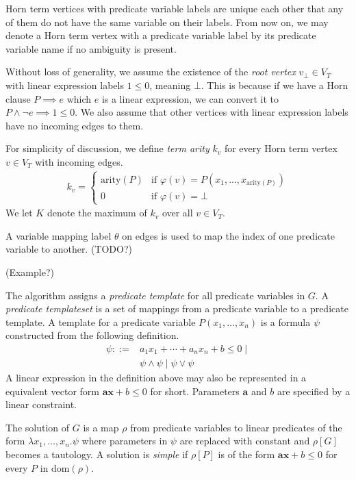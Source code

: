 \documentclass[a4paper,12pt]{article}
\begin{document}
Horn term vertices with predicate variable labels are unique each
other that any of them do not have the same variable on their labels.
From now on, we may denote a Horn term vertex with a predicate
variable label by its predicate variable name if no ambiguity is
present.

Without loss of generality, we assume the existence of the \emph{root
  vertex} $v_\bot \in V_T$ with linear expression labels $1 \leq 0$,
meaning $\bot$.  This is because if we have a Horn clause $P \implies
e$ which $e$ is a linear expression, we can convert it to $P \wedge
\neg e \implies 1 \leq 0$.  We also assume that other vertices with
linear expression labels have no incoming edges to them.

For simplicity of discussion, we define \emph{term arity} $k_v$ for
every Horn term vertex $v \in V_T$ with incoming edges.
\begin{align*}
k_v =
\begin{cases}
\mathrm{arity}(P) & \mbox{if } \varphi(v) = P(x_1,...,x_{\mathrm{arity}(P)}) \\
0 & \mbox{if } \varphi(v) = \bot
\end{cases}
\end{align*}
We let $K$ denote the maximum of $k_v$ over all $v \in V_T$.

A variable mapping label $\theta$ on edges is used to map the index of
one predicate variable to another. (TODO?)

(Example?)

The algorithm assigns a \emph{predicate template} for all predicate
variables in $G$. A \emph{predicate templateset} is a set of mappings from
a predicate variable to a predicate template.  A template for a
predicate variable $P(x_1, \ldots, x_n)$ is a formula $\psi$
constructed from the following definition.
\begin{align*}
\psi ::= & a_1 x_1 + \cdots + a_n x_n + b \leq 0 \mid \\
& \psi \wedge \psi \mid \psi \vee \psi
\end{align*}
A linear expression in the definition above may also be represented in
a equivalent vector form $\mathbf{a} \mathbf{x} + b \leq 0$ for short.
Parameters $\mathbf{a}$ and $b$ are specified by a linear constraint.

The solution of $G$ is a map $\rho$ from predicate variables to linear
predicates of the form $\lambda x_1, \ldots ,x_n. \psi$ where
parameters in $\psi$ are replaced with constant and $\rho[G]$ becomes
a tautology.  A solution is \textit{simple} if $\rho[P]$ is of the
form $\mathbf{a} \mathbf{x} + b \leq 0$ for every $P$ in
$\mathrm{dom}(\rho)$.
\end{document}
